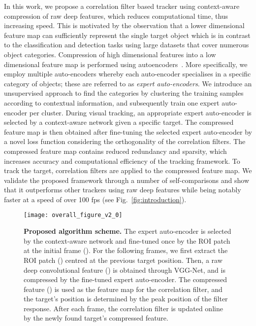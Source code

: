 \documentclass[10pt,twocolumn,letterpaper]{article}
\begin{document}
In this work, we propose a correlation filter based tracker using context-aware compression of raw deep features, which reduces computational time, thus increasing speed.
This is motivated by the observation that a lower dimensional feature map can sufficiently represent the single target object which is in contrast to the classification and detection tasks using large datasets that cover numerous object categories.
Compression of high dimensional features into a low dimensional feature map is performed using autoencoders~\cite{ref:dAE, ref:ae1, ref:ae2, ref:ae3}.
More specifically, we employ multiple auto-encoders whereby each auto-encoder specialises in a specific category of objects; these are referred to as \textit{expert auto-encoders}.
We introduce an unsupervised approach to find the categories by clustering the training samples according to contextual information, and subsequently train one expert auto-encoder per cluster.
During visual tracking, an appropriate expert auto-encoder is selected by a context-aware network given a specific target. 
The compressed feature map is then obtained after fine-tuning the selected expert auto-encoder by a novel loss function considering the orthogonality of the correlation filters.
The compressed feature map contains reduced redundancy and sparsity, which increases accuracy and computational efficiency of the tracking framework.
To track the target, correlation filters are applied to the compressed feature map.
We validate the proposed framework through a number of self-comparisons and show that it outperforms other trackers using raw deep features while being notably faster at a speed of over 100 fps (see Fig.~\ref{fig:introduction}).


 \begin{figure*}[t]
\centering
    \texttt{[image: overall\_figure\_v2\_0]}
    \vspace{-0.1cm}
    \caption{ {\bf{Proposed algorithm scheme.}} The expert auto-encoder is selected by the context-aware network and fine-tuned once by the ROI patch at the initial frame (). For the following frames, we first extract the ROI patch () centred at the previous target position. Then, a raw deep convolutional feature () is obtained through VGG-Net, and is compressed by the fine-tuned expert auto-encoder. The compressed feature () is used as the feature map for the correlation filter, and the target's position is determined by the peak position of the filter response. After each frame, the correlation filter is updated online by the newly found target's compressed feature.}
    \label{fig:framework}
\vspace{-0.4cm}
\end{figure*}
\end{document}
